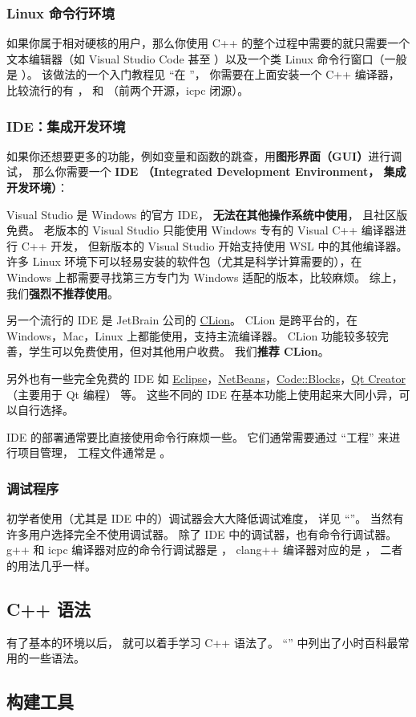\subsubsection{Linux 命令行环境}
如果你属于相对硬核的用户，那么你使用 C++ 的整个过程中需要的就只需要一个文本编辑器（如 Visual Studio Code 甚至 ）以及一个类 Linux 命令行窗口（一般是 ）。 该做法的一个入门教程见 “在 ”， 你需要在上面安装一个 C++ 编译器， 比较流行的有 ，  和 （前两个开源，icpc 闭源）。

\subsubsection{IDE：集成开发环境}
如果你还想要更多的功能，例如变量和函数的跳查，用\textbf{图形界面（GUI）}进行调试， 那么你需要一个 \textbf{IDE （Integrated Development Environment， 集成开发环境）}：

Visual Studio 是 Windows 的官方 IDE， \textbf{无法在其他操作系统中使用}， 且社区版免费。 老版本的 Visual Studio 只能使用 Windows 专有的 Visual C++ 编译器进行 C++ 开发， 但新版本的 Visual Studio 开始支持使用 WSL 中的其他编译器。 许多 Linux 环境下可以轻易安装的软件包（尤其是科学计算需要的），在 Windows 上都需要寻找第三方专门为 Windows 适配的版本，比较麻烦。 综上，我们\textbf{强烈不推荐使用}。

另一个流行的 IDE 是 JetBrain 公司的 \href{https://www.jetbrains.com/clion/}{CLion}。 CLion 是跨平台的，在 Windows，Mac，Linux 上都能使用，支持主流编译器。 CLion 功能较多较完善，学生可以免费使用，但对其他用户收费。 我们\textbf{推荐 CLion}。

另外也有一些完全免费的 IDE 如 \href{https://eclipseide.org/}{Eclipse}，\href{https://netbeans.apache.org/front/main/index.html}{NetBeans}，\href{https://www.codeblocks.org/}{Code::Blocks}，\href{https://www.qt.io/product/development-tools}{Qt Creator} （主要用于 Qt 编程） 等。 这些不同的 IDE 在基本功能上使用起来大同小异，可以自行选择。

IDE 的部署通常要比直接使用命令行麻烦一些。 它们通常需要通过 “工程” 来进行项目管理， 工程文件通常是 。

\subsubsection{调试程序}
初学者使用（尤其是 IDE 中的）调试器会大大降低调试难度， 详见 “”。 当然有许多用户选择完全不使用调试器。 除了 IDE 中的调试器，也有命令行调试器。 g++ 和 icpc 编译器对应的命令行调试器是 ， clang++ 编译器对应的是 ， 二者的用法几乎一样。

\subsection{C++ 语法}
有了基本的环境以后， 就可以着手学习 C++ 语法了。 “” 中列出了小时百科最常用的一些语法。

\subsection{构建工具}
